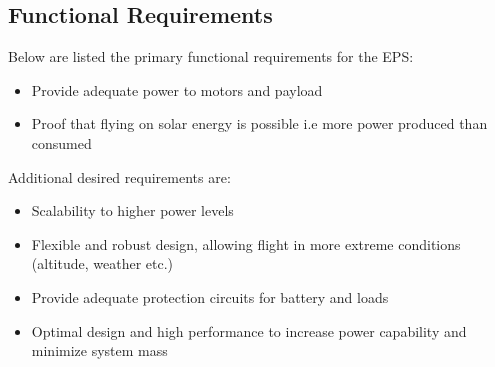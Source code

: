 \subsection{Functional Requirements}
%
Below are listed the primary functional requirements for the \ac{EPS}:
%
\begin{itemize}
\item Provide adequate power to motors and payload
\item Proof that flying on solar energy is possible i.e more power produced than consumed
\end{itemize}
%
Additional desired requirements are:
%
\begin{itemize}
\item Scalability to higher power levels
\item Flexible and robust design, allowing flight in more extreme conditions (altitude, weather etc.)
\item Provide adequate protection circuits for battery and loads
\item Optimal design and high performance to increase power capability and minimize system mass
\end{itemize}
%
%
